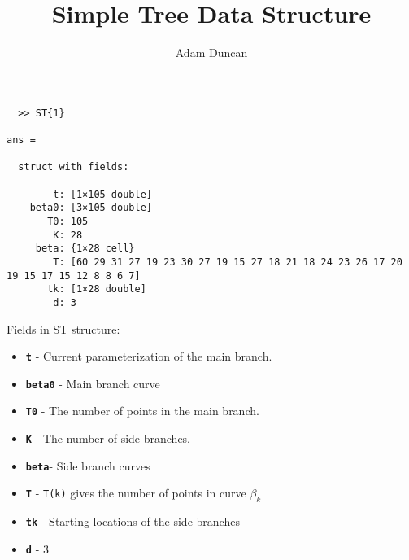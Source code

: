 \documentclass[10pt,a4paper]{article}
\title{Simple Tree Data Structure}
\author{Adam Duncan}
\begin{document}
\maketitle



\begin{verbatim}
  >> ST{1}

ans =

  struct with fields:

        t: [1×105 double]
    beta0: [3×105 double]
       T0: 105
        K: 28
     beta: {1×28 cell}
        T: [60 29 31 27 19 23 30 27 19 15 27 18 21 18 24 23 26 17 20 19 15 17 15 12 8 8 6 7]
       tk: [1×28 double]
        d: 3

\end{verbatim}

Fields in ST structure:
\begin{itemize}
  \item {\bf \texttt{t}} - 
 Current parameterization of the main branch. 

  \item {\bf \texttt{beta0}} - Main branch curve

  \item {\bf \texttt{T0}} -
  The number of points in the main branch.

  \item {\bf \texttt{K}} -
  The number of side branches.

  \item {\bf \texttt{beta}}- Side branch curves


  \item {\bf \texttt{T}} -
\texttt{T(k)} gives the number of points in curve $\beta_k$

  \item {\bf \texttt{tk}} - Starting locations of the side branches 
  \item {\bf \texttt{d}} -
  3
  
  \end{itemize}
\end{document}
